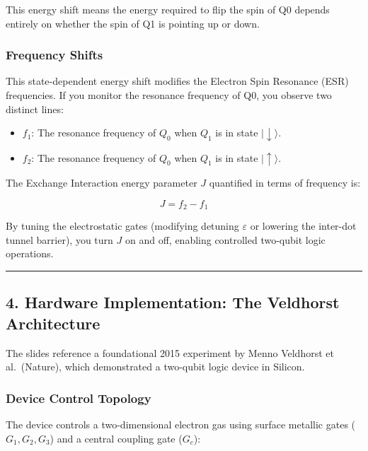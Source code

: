 \documentclass[
]{article}
\providecommand{\tightlist}{%
  \setlength{\itemsep}{0pt}\setlength{\parskip}{0pt}}
\begin{document}
This energy shift means the energy required to flip the spin of Q0
depends entirely on whether the spin of Q1 is pointing up or down.

\subsubsection{Frequency Shifts}\label{frequency-shifts}

This state-dependent energy shift modifies the Electron Spin Resonance
(ESR) frequencies. If you monitor the resonance frequency of Q0, you
observe two distinct lines:

\begin{itemize}
\tightlist
\item
  \(f_1\): The resonance frequency of \(Q_0\) when \(Q_1\) is in state
  \(|\downarrow\rangle\).
\item
  \(f_2\): The resonance frequency of \(Q_0\) when \(Q_1\) is in state
  \(|\uparrow\rangle\).
\end{itemize}

The Exchange Interaction energy parameter \(J\) quantified in terms of
frequency is:

\[J = f_2 - f_1\]

By tuning the electrostatic gates (modifying detuning \(\varepsilon\) or
lowering the inter-dot tunnel barrier), you turn \(J\) on and off,
enabling controlled two-qubit logic operations.

\begin{center}\rule{0.5\linewidth}{0.5pt}\end{center}

\subsection{4. Hardware Implementation: The Veldhorst
Architecture}\label{hardware-implementation-the-veldhorst-architecture}

The slides reference a foundational 2015 experiment by Menno Veldhorst
et al.~(Nature), which demonstrated a two-qubit logic device in Silicon.

\subsubsection{Device Control Topology}\label{device-control-topology}

The device controls a two-dimensional electron gas using surface
metallic gates (\(G_1, G_2, G_3\)) and a central coupling gate
(\(G_c\)):
\end{document}
